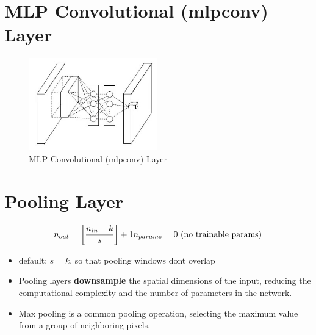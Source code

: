 
\section{MLP Convolutional (mlpconv) Layer \cite{medium/towardsdatascience.com/review-nin-network-in-network-image-classification-69e271e499ee}}

\begin{figure}[h]
    \centering
    \includegraphics[width=\linewidth, height=4cm, keepaspectratio]{Pictures/layers/conv-layer-mlp.jpg}
    \caption{MLP Convolutional (mlpconv) Layer}
\end{figure}




\section{Pooling Layer \cite{gfg-convolutional-neural-network-cnn-in-machine-learning}}\label{nn: Pooling Layer}

\[
   \displaystyle n_{out} = \left[ \frac{n_{in} - k}{s} \right] + 1
   \hfill
   n_{params} = 0 \text{ (no trainable params)}
\]

\begin{itemize}
    \item default: $s=k$, so that pooling windows dont overlap

    \item Pooling layers \textbf{downsample} the spatial dimensions of the input, reducing the computational complexity and the number of parameters in the network. 
    
    \item Max pooling is a common pooling operation, selecting the maximum value from a group of neighboring pixels.

\end{itemize}


